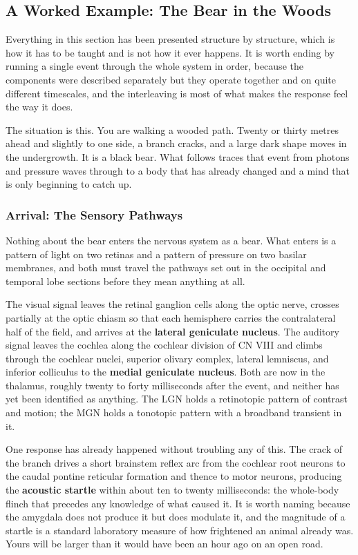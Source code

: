 \documentclass[11pt]{article}
\begin{document}
\subsection{A Worked Example: The Bear in the Woods}

Everything in this section has been presented structure by structure, which is how it has to be taught and is not how it ever happens. It is worth ending by running a single event through the whole system in order, because the components were described separately but they operate together and on quite different timescales, and the interleaving is most of what makes the response feel the way it does.

The situation is this. You are walking a wooded path. Twenty or thirty metres ahead and slightly to one side, a branch cracks, and a large dark shape moves in the undergrowth. It is a black bear. What follows traces that event from photons and pressure waves through to a body that has already changed and a mind that is only beginning to catch up.

\subsubsection{Arrival: The Sensory Pathways}

Nothing about the bear enters the nervous system as a bear. What enters is a pattern of light on two retinas and a pattern of pressure on two basilar membranes, and both must travel the pathways set out in the occipital and temporal lobe sections before they mean anything at all.

The visual signal leaves the retinal ganglion cells along the optic nerve, crosses partially at the optic chiasm so that each hemisphere carries the contralateral half of the field, and arrives at the \textbf{lateral geniculate nucleus}. The auditory signal leaves the cochlea along the cochlear division of CN VIII and climbs through the cochlear nuclei, superior olivary complex, lateral lemniscus, and inferior colliculus to the \textbf{medial geniculate nucleus}. Both are now in the thalamus, roughly twenty to forty milliseconds after the event, and neither has yet been identified as anything. The LGN holds a retinotopic pattern of contrast and motion; the MGN holds a tonotopic pattern with a broadband transient in it.

One response has already happened without troubling any of this. The crack of the branch drives a short brainstem reflex arc from the cochlear root neurons to the caudal pontine reticular formation and thence to motor neurons, producing the \textbf{acoustic startle} within about ten to twenty milliseconds: the whole-body flinch that precedes any knowledge of what caused it. It is worth naming because the amygdala does not produce it but does modulate it, and the magnitude of a startle is a standard laboratory measure of how frightened an animal already was. Yours will be larger than it would have been an hour ago on an open road.
\end{document}
